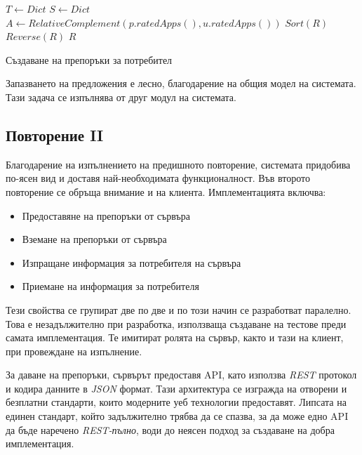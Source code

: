 		\begin{algorithm}[h]
			\label{algorithm:get-recommendations}
			$T \longleftarrow Dict $\;
			$S \longleftarrow Dict $\;
			$A \longleftarrow RelativeComplement(p.ratedApps(), u.ratedApps())$\;
			$Sort(R)$\;
			$Reverse(R)$\;
			\Return $R$\;
			\caption{Създаване на препоръки за потребител}
		\end{algorithm}
		
		Запазването на предложения е лесно, благодарение на общия модел на системата. Тази задача се изпълнява от друг модул на системата.
		
		\subsection{Повторение II}
		
		Благодарение на изпълнението на предишното повторение, системата придобива по-ясен вид и доставя най-необходимата функционалност. Във второто повторение се обръща внимание и на клиента. Имплементацията включва:
		
		\begin{itemize}
			\item Предоставяне на препоръки от сървъра
			\item Вземане на препоръки от сървъра
			\item Изпращане информация за потребителя на сървъра
			\item Приемане на информация за потребителя
		\end{itemize}
		
		Тези свойства се групират две по две и по този начин се разработват паралелно. Това е незадължително при разработка, използваща създаване на тестове преди самата имплементация. Те имитират ролята на сървър, както и тази на клиент, при провеждане на изпълнение.
		
		За даване на препоръки, сървърът предоставя \ac{API}, като използва \emph{REST} протокол и кодира данните в \emph{JSON} формат. Тази архитектура се изгражда на отворени и безплатни стандарти, които модерните уеб технологии предоставят. Липсата на единен стандарт, който задължително трябва да се спазва, за да може едно \ac{API} да бъде наречено \emph{REST-пълно}, води до неясен подход за създаване на добра имплементация.
		
